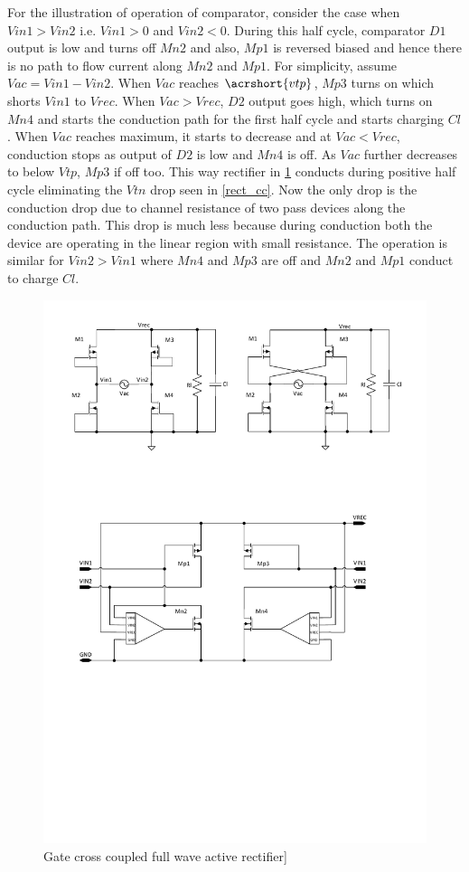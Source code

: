 \documentclass[12pt,a4paper,UKenglish]{report}
\begin{document}
For the illustration of operation of comparator, consider the case when $Vin1 > Vin2$ i.e. $Vin1 > 0$ and $Vin2 < 0$. During this half cycle, comparator $D1$ output is low and turns off $Mn2$ and also, $Mp1$ is reversed biased and hence there is no path to flow current along $Mn2$ and $Mp1$. For simplicity, assume $Vac =  Vin1 - Vin2$. When $Vac$ reaches $\acrshort{vtp}$, $Mp3$ turns on which shorts $Vin1$ to $Vrec$. When $Vac > Vrec$, $D2$ output goes high, which turns on $Mn4$ and starts the conduction path for the first half cycle and starts charging $Cl$. When $Vac$ reaches maximum, it starts to decrease and at $Vac < Vrec$, conduction stops as output of $D2$ is low and $Mn4$ is off. As $Vac$ further decreases to below $Vtp$, $Mp3$ if off too. This way rectifier in \ref{rect_rcc}  conducts during positive half cycle eliminating the $Vtn$ drop seen in \ref{rect_cc}. Now the only drop is the conduction drop due to channel resistance of two pass devices along the conduction path. This drop is much less because during conduction both the device are operating in the linear region with small resistance. The operation is similar for $Vin2 > Vin1$ where $Mn4$ and $Mp3$ are off and $Mn2$ and $Mp1$ conduct to charge $Cl$. \\

\begin{figure}[htbp] %
   \centering
   \includegraphics[width=\textwidth]{img/visio/visio_rect_rcc.pdf} 
   \caption{Gate cross coupled full wave active rectifier]}
   \label{rect_rcc}
\end{figure}
\end{document}
